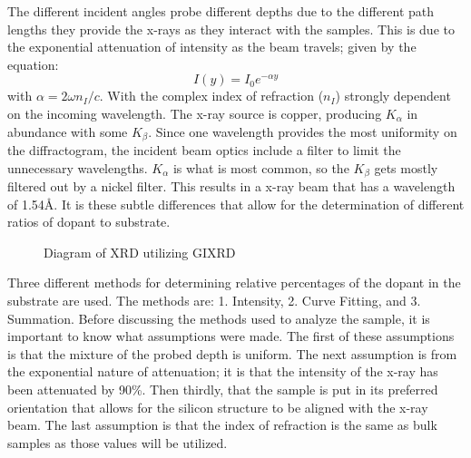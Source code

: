     The different incident angles probe different depths due to the different path lengths they provide the x-rays as they interact with the samples. 
    This is due to the exponential attenuation of intensity as the beam travels; given by the equation: 
    \begin{equation}
        I(y)=I_0e^{-\alpha y}
        \label{eq: attenuation}
    \end{equation}
    with $\alpha=2\omega n_I/c$\cite{https://doi.org/10.1002/jps.22202,hecht}. 
    With the complex index of refraction ($n_I$) strongly dependent on the incoming wavelength. 
    The x-ray source is copper, producing $K_\alpha$ in abundance with some $K_\beta$. 
    Since one wavelength provides the most uniformity on the diffractogram, the incident beam optics include a filter to limit the unnecessary wavelengths. 
    $K_\alpha$ is what is most common, so the $K_\beta$ gets mostly filtered out by a nickel filter. 
    This results in a x-ray beam that has a wavelength of 1.54\AA.
    It is these subtle differences that allow for the determination of different ratios of dopant to substrate.

    \begin{figure}[H]
        \centering

        
        \caption{Diagram of XRD utilizing GIXRD}
        \label{fig:GIXRD diagram}
    \end{figure}

    Three different methods for determining relative percentages of the dopant in the substrate are used.
    The methods are: 1. Intensity\cite{pandey_structural_2021}, 2. Curve Fitting, and 3. Summation.
    Before discussing the methods used to analyze the sample, it is important to know what assumptions were made. 
    The first of these assumptions is that the mixture of the probed depth is uniform.
    The next assumption is from the exponential nature of attenuation; 
    it is that the intensity of the x-ray has been attenuated by 90\%. 
    Then thirdly, that the sample is put in its preferred orientation that allows for the silicon structure to be aligned with the x-ray beam.
    The last assumption is that the index of refraction is the same as bulk samples\cite{COLOMBI2007554} as those values will be utilized.


